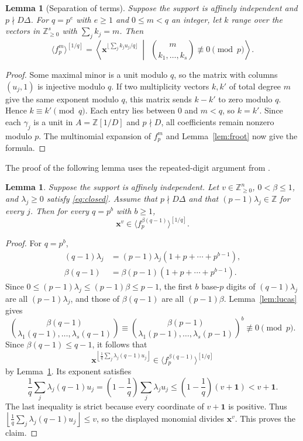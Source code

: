 \documentclass[11pt]{amsart}
\numberwithin{equation}{section}
\newtheorem{lemma}[theorem]{Lemma}
\theoremstyle{definition}
\newcommand{\Z}{\mathbb Z}
\newcommand{\xx}{\boldsymbol{x}}
\newcommand{\one}{\boldsymbol{1}}
\begin{document}
\begin{lemma}[Separation of terms]\label{lem:separation}
Suppose the support is affinely independent and $p\nmid D\Delta$.
For $q=p^e$ with $e\ge1$ and $0\le m<q$ an integer, let $k$ range over the vectors in $\Z_{\ge 0}^s$ with $\sum_j k_j=m$. Then
\[
\langle f_p^m\rangle^{[1/q]}=
\left\langle \xx^{\lfloor\sum_j k_j u_j/q\rfloor}
\ \middle|\ \
\binom{m}{k_1,\ldots,k_s}\not\equiv0\pmod p\right\rangle .
\]
\end{lemma}
\begin{proof}
Some maximal minor is a unit modulo $q$, so the matrix with columns
$(u_j,1)$ is injective modulo $q$. If two multiplicity vectors $k,k'$
of total degree $m$ give the same exponent modulo $q$, this matrix
sends $k-k'$ to zero modulo $q$. Hence $k\equiv k'\pmod q$.
Each entry lies between $0$ and $m<q$, so $k=k'$.
Since each $\gamma_j$ is a unit in $A=\Z[1/D]$ and $p\nmid D$,
all coefficients remain nonzero modulo $p$. 
The multinomial expansion of $f_p^m$ and Lemma~\ref{lem:froot}
now give the formula.
\end{proof}

The proof of the following lemma uses the repeated-digit argument
from \cite[Example~4.2]{MTW}.

\begin{lemma}\label{lem:endpoint}
Suppose the support is affinely independent. Let $v\in\Z_{\ge 0}^n$,
$0<\beta\le1$, and $\lambda_j\ge0$ satisfy \eqref{eq:closed}.
Assume that $p\nmid D\Delta$ and that $(p-1)\lambda_j\in\Z$ for every $j$.
Then for every $q=p^b$ with $b\ge1$,
\[
 \xx^v\in\langle f_p^{\beta(q-1)}\rangle^{[1/q]}.
\]
\end{lemma}
\begin{proof}
For $q=p^b$, 
\[
\begin{aligned} (q-1)\lambda_j&=(p-1)\lambda_j (1+p+\cdots+p^{b-1}),\\
 \beta(q-1)&=\beta(p-1) (1+p+\cdots+p^{b-1}).\end{aligned}
\]
Since $0\le(p-1)\lambda_j\le(p-1)\beta\le p-1$, the first $b$
base-$p$ digits of $(q-1)\lambda_j$ are all $(p-1)\lambda_j$,
and those of $\beta(q-1)$ are all $(p-1)\beta$.
Lemma~\ref{lem:lucas} gives
\[
 \binom{\beta(q-1)}{\lambda_1(q-1),\ldots,\lambda_s(q-1)}
 \equiv\binom{\beta(p-1)}{\lambda_1(p-1),\ldots,\lambda_s(p-1)}^{b}\not\equiv0\pmod p.
\]
Since $\beta(q-1)\le q-1$, it follows that 
\[
\xx^{\left \lfloor \frac1q \sum_j\lambda_j(q-1)u_j\right\rfloor}\in \langle f_p^{\beta(q-1)}\rangle^{[1/q]}
\]
by Lemma~\ref{lem:separation}. 
Its exponent satisfies
\[
 \frac1q\sum_j\lambda_j(q-1)u_j
 =\left(1-\frac1q\right)\sum_j\lambda_ju_j
 \le\left(1-\frac1q\right)(v+\one)<v+\one.
\]
The last inequality is strict because every coordinate of $v+\one$ is
positive. Thus $\left\lfloor\frac1q\sum_j \lambda_j(q-1)u_j\right\rfloor\le v$, so the displayed monomial divides $\xx^v$. This proves the claim.
\end{proof}
\end{document}
